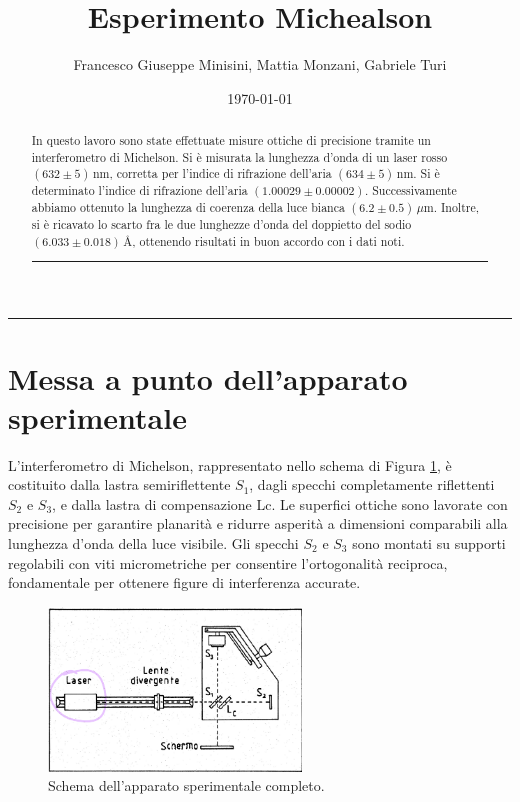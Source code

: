 \documentclass[a4paper,12pt]{article}
\title{Esperimento Michealson}
\author{Francesco Giuseppe Minisini, Mattia Monzani, Gabriele Turi}
\date{\today}
\begin{document}
\maketitle
\hrule
\vspace{9pt}
\begin{abstract}
    \noindent
    In questo lavoro sono state effettuate misure ottiche di precisione tramite un interferometro di Michelson. Si è misurata la lunghezza d’onda di un laser rosso \((632 \pm 5)\,\text{nm}\), corretta per l’indice di rifrazione dell’aria \((634 \pm 5)\,\text{nm}\). Si è determinato l’indice di rifrazione dell’aria \((1.00029 \pm 0.00002)\). Successivamente abbiamo ottenuto la lunghezza di coerenza della luce bianca \((6.2 \pm 0.5)\,\mu\text{m}\). Inoltre, si è ricavato lo scarto fra le due lunghezze d’onda del doppietto del sodio \((6.033 \pm 0.018)\,\text{\AA}\), ottenendo risultati in buon accordo con i dati noti.
\vspace{20 pt}
\hrule
\end{abstract}
\vspace{2 pt}


\section{Messa a punto dell'apparato sperimentale}
L’interferometro di Michelson, rappresentato nello schema di Figura \ref{fig:apparato_completo}, è costituito dalla lastra semiriflettente \(S_1\), dagli specchi completamente riflettenti \(S_2\) e \(S_3\), e dalla lastra di compensazione Lc. Le superfici ottiche sono lavorate con precisione per garantire planarità e ridurre asperità a dimensioni comparabili alla lunghezza d’onda della luce visibile. Gli specchi \(S_2\) e \(S_3\) sono montati su supporti regolabili con viti micrometriche per consentire l’ortogonalità reciproca, fondamentale per ottenere figure di interferenza accurate.

\begin{figure}[H]
    \centering
    \includegraphics[width=0.6\textwidth]{Apparato2.png}
    \caption{Schema dell'apparato sperimentale completo.}
    \label{fig:apparato_completo}
\end{figure}
\end{document}
